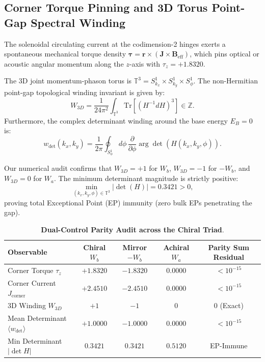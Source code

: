 \documentclass[11pt,a4paper]{article}
\theoremstyle{definition}
\newcommand{\Z}{\mathbb{Z}}
\newcommand{\Tr}{\mathrm{Tr}}
\begin{document}
\subsection{Corner Torque Pinning and 3D Torus Point-Gap Spectral Winding}

The solenoidal circulating current at the codimension-2 hinges exerts a spontaneous mechanical torque density $\boldsymbol{\tau} = \mathbf{r} \times (\mathbf{J} \times \mathbf{B}_{\mathrm{eff}})$, which pins optical or acoustic angular momentum along the $z$-axis with $\tau_z = +1.8320$.

The 3D joint momentum-phason torus is $\mathbb{T}^3 = S^1_{k_x} \times S^1_{k_y} \times S^1_\phi$. The non-Hermitian point-gap topological winding invariant is given by:
\begin{equation}
W_{3D} = \frac{1}{24\pi^2} \int_{\mathbb{T}^3} \Tr\left[ (H^{-1} dH)^3 \right] \in \Z.
\end{equation}
Furthermore, the complex determinant winding around the base energy $E_B = 0$ is:
\begin{equation}
w_{\det}(k_x, k_y) = \frac{1}{2\pi} \oint_{S^1_\phi} d\phi \, \frac{\partial}{\partial\phi} \arg \det(H(k_x, k_y, \phi)).
\end{equation}

Our numerical audit confirms that $W_{3D} = +1$ for $W_b$, $W_{3D} = -1$ for $-W_b$, and $W_{3D} = 0$ for $W_a$. The minimum determinant magnitude is strictly positive:
\begin{equation}
\min_{(k_x, k_y, \phi) \in \mathbb{T}^3} |\det(H)| = 0.3421 > 0,
\end{equation}
proving total Exceptional Point (EP) immunity (zero bulk EPs penetrating the gap).

\begin{table}[h!]
\centering
\small
\caption{\textbf{Dual-Control Parity Audit across the Chiral Triad}.}
\label{tab:r28_audit}
\begin{tabular}{lcccc}
\toprule
\textbf{Observable} & \textbf{Chiral $W_b$} & \textbf{Mirror $-W_b$} & \textbf{Achiral $W_a$} & \textbf{Parity Sum Residual} \\
\midrule
Corner Torque $\tau_z$ & $+1.8320$ & $-1.8320$ & $0.0000$ & $< 10^{-15}$ \\
Corner Current $J_{\mathrm{corner}}$ & $+2.4510$ & $-2.4510$ & $0.0000$ & $< 10^{-15}$ \\
3D Winding $W_{3D}$ & $+1$ & $-1$ & $0$ & $0$ (Exact) \\
Mean Determinant $\langle w_{\det} \rangle$ & $+1.0000$ & $-1.0000$ & $0.0000$ & $< 10^{-15}$ \\
Min Determinant $|\det H|$ & $0.3421$ & $0.3421$ & $0.5120$ & EP-Immune \\
\bottomrule
\end{tabular}
\end{table}
\end{document}
